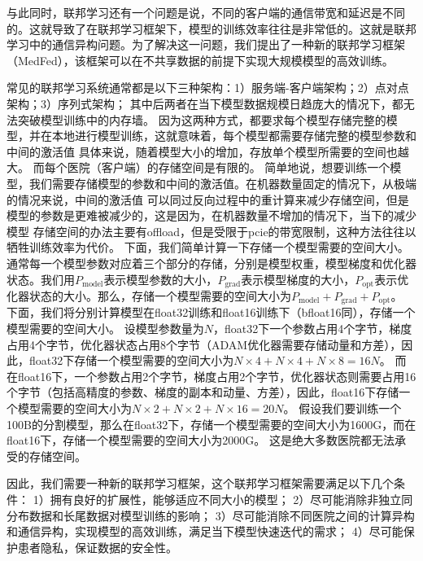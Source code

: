 与此同时，联邦学习还有一个问题是说，不同的客户端的通信带宽和延迟是不同的。这就导致了在联邦学习框架下，模型的训练效率往往是非常低的。这就是联邦学习中的通信异构问题。为了解决这一问题，我们提出了一种新的联邦学习框架（MedFed），该框架可以在不共享数据的前提下实现大规模模型的高效训练。

常见的联邦学习系统通常都是以下三种架构：1）服务端-客户端架构；2）点对点架构；3）序列式架构；
其中后两者在当下模型数据规模日趋庞大的情况下，都无法突破模型训练中的内存墙。
因为这两种方式，都要求每个模型存储完整的模型，并在本地进行模型训练，这就意味着，每个模型都需要存储完整的模型参数和中间的激活值
具体来说，随着模型大小的增加，存放单个模型所需要的空间也越大。
而每个医院（客户端）的存储空间是有限的。
简单地说，想要训练一个模型，我们需要存储模型的参数和中间的激活值。在机器数量固定的情况下，从极端的情况来说，中间的激活值
可以同过反向过程中的重计算\supercite{DBLP:journals/corr/abs-1911-13214}来减少存储空间，但是模型的参数是更难被减少的，这是因为，在机器数量不增加的情况下，当下的减少模型
存储空间的办法主要有offload\supercite{8820980, DBLP:journals/corr/abs-2101-06840, DBLP:journals/corr/abs-2104-07857}，但是受限于pcie的带宽限制，这种方法往往以牺牲训练效率为代价。
下面，我们简单计算一下存储一个模型需要的空间大小。通常每一个模型参数对应着三个部分的存储，分别是模型权重，模型梯度和优化器状态。我们用$P_{\text{model}}$表示模型参数的大小，$P_{\text{grad}}$表示模型梯度的大小，$P_{\text{opt}}$表示优化器状态的大小。那么，存储一个模型需要的空间大小为$P_{\text{model}} + P_{\text{grad}} + P_{\text{opt}}$。
下面，我们将分别计算模型在float32训练和float16训练下（bfloat16同），存储一个模型需要的空间大小。
设模型参数量为$N$，float32下一个参数占用4个字节，梯度占用4个字节，优化器状态占用8个字节（ADAM优化器需要存储动量和方差），因此，float32下存储一个模型需要的空间大小为$N \times 4 + N \times 4 + N \times 8 = 16N$。
而在float16下，一个参数占用2个字节，梯度占用2个字节，优化器状态则需要占用16个字节（包括高精度的参数、梯度的副本和动量、方差），因此，float16下存储一个模型需要的空间大小为$N \times 2 + N \times 2 + N \times 16 = 20N$。
假设我们要训练一个100B的分割模型，那么在float32下，存储一个模型需要的空间大小为1600G，而在float16下，存储一个模型需要的空间大小为2000G。
这是绝大多数医院都无法承受的存储空间。

因此，我们需要一种新的联邦学习框架，这个联邦学习框架需要满足以下几个条件：
1）拥有良好的扩展性，能够适应不同大小的模型；
2）尽可能消除非独立同分布数据和长尾数据对模型训练的影响；
3）尽可能消除不同医院之间的计算异构和通信异构，实现模型的高效训练，满足当下模型快速迭代的需求；
4）尽可能保护患者隐私，保证数据的安全性。


